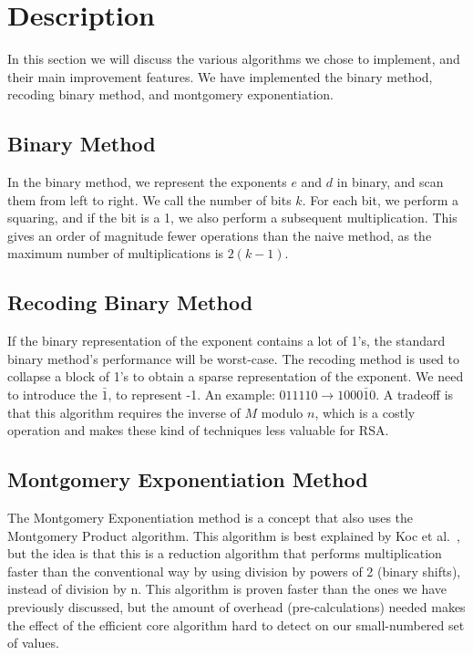 \documentclass[twocolumn]{IEEEtran}
\begin{document}
\section{Description}
In this section we will discuss the various algorithms we chose to implement, and their main improvement features. We have implemented the binary method, recoding binary method, and montgomery exponentiation.

\subsection*{Binary Method}
In the binary method, we represent the exponents $e$ and $d$ in binary, and scan them from left to right. We call the number of bits $k$. For each bit, we perform a squaring, and if the bit is a 1, we also perform a subsequent multiplication. This gives an order of magnitude fewer operations than the naive method, as the maximum number of multiplications is $2(k-1)$.

\subsection*{Recoding Binary Method}
If the binary representation of the exponent contains a lot of 1's, the standard binary method's performance will be worst-case. The recoding method is used to collapse a block of 1's to obtain a sparse representation of the exponent. We need to introduce the $\bar{1}$, to represent -1. An example: $011110 \rightarrow 1000\bar{1}0$. A tradeoff is that this algorithm requires the inverse of $M$ modulo $n$, which is a costly operation and makes these kind of techniques less valuable for RSA.

\subsection*{Montgomery Exponentiation Method}
The Montgomery Exponentiation method is a concept that also uses the Montgomery Product algorithm. This algorithm is best explained by Koc et al.~\cite{koc}, but the idea is that this is a reduction algorithm that performs multiplication faster than the conventional way by using division by powers of 2 (binary shifts), instead of division by n. This algorithm is proven faster than the ones we have previously discussed, but the amount of overhead (pre-calculations) needed makes the effect of the efficient core algorithm hard to detect on our small-numbered set of values.
\end{document}
